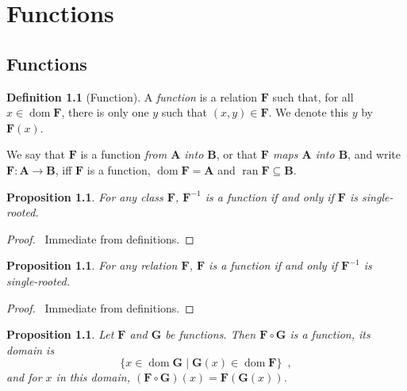 \documentclass{book}
\let\qed\relax
\newtheorem{prop}[ax]{Proposition}
\theoremstyle{definition}
\newtheorem{df}[ax]{Definition}
\newcommand{\dom}{\ensuremath{\operatorname{dom}}}
\newcommand{\ran}{\ensuremath{\operatorname{ran}}}
\begin{document}
\chapter{Functions}

\section{Functions}

\begin{df}[Function]
A \emph{function} is a relation $\mathbf{F}$ such that, for all $x \in \dom \mathbf{F}$, there is only one $y$ such that $(x,y) \in \mathbf{F}$. We denote this $y$ by $\mathbf{F}(x)$.

We say that $\mathbf{F}$ is a function \emph{from $\mathbf{A}$ into $\mathbf{B}$}, or that \emph{$\mathbf{F}$ maps $\mathbf{A}$ into $\mathbf{B}$}, and write $\mathbf{F} : \mathbf{A} \rightarrow \mathbf{B}$, iff $\mathbf{F}$ is a function, $\dom \mathbf{F} = \mathbf{A}$ and $\ran \mathbf{F} \subseteq \mathbf{B}$.
\end{df}

\begin{prop}
\label{prop:invfunc}
For any class $\mathbf{F}$, $\mathbf{F}^{-1}$ is a function if and only if $\mathbf{F}$ is single-rooted.
\end{prop}

\begin{proof}
\pf\ Immediate from definitions. \qed
\end{proof}

\begin{prop}
\label{prop:invsingroot}
For any relation $\mathbf{F}$, $\mathbf{F}$ is a function if and only if $\mathbf{F}^{-1}$ is single-rooted.
\end{prop}

\begin{proof}
\pf\ Immediate from definitions. \qed
\end{proof}

\begin{prop}
Let $\mathbf{F}$ and $\mathbf{G}$ be functions. Then $\mathbf{F} \circ \mathbf{G}$ is a function, its domain is
\[ \{ x \in \dom \mathbf{G} \mid \mathbf{G}(x) \in \dom \mathbf{F} \} \enspace , \]
and for $x$ in this domain, $(\mathbf{F} \circ \mathbf{G})(x) = \mathbf{F}(\mathbf{G}(x))$.
\end{prop}
\end{document}
